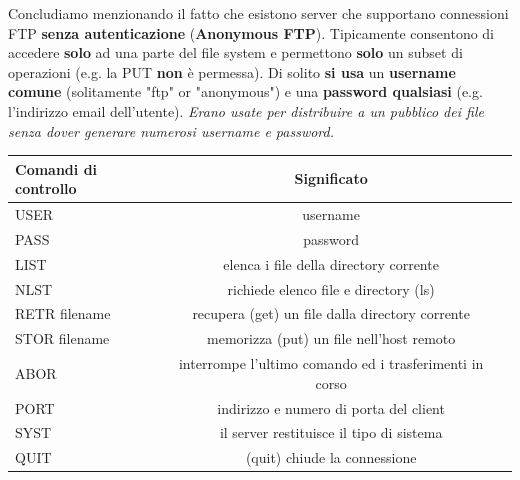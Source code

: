 \documentclass[11pt,a4paper]{article}
\theoremstyle{definition}
\begin{document}
Concludiamo menzionando il fatto che esistono server che supportano connessioni FTP \textbf{senza autenticazione} (\textbf{Anonymous FTP}).  Tipicamente consentono di accedere \textbf{solo} ad una parte del file system e permettono \textbf{solo} un subset di operazioni (e.g. la PUT \textbf{non} è permessa). Di solito \textbf{si usa} un \textbf{username comune} (solitamente "ftp" or "anonymous") e una \textbf{password qualsiasi} (e.g. l'indirizzo email dell'utente).\textit{ Erano usate per distribuire a un pubblico dei file senza dover generare numerosi username e password.}
\begin{table}[h!]
	\begin{center}
		\label{tab:table1}
		\begin{tabular}{l|c|r}
			\textbf{Comandi di controllo} & \textbf{Significato}             \\
			\hline
			USER                          & username                         \\
			PASS                          & password                         \\
			LIST                          & elenca i file della
			directory corrente                                               \\
			NLST                          & richiede elenco file e
			directory (ls)                                                   \\
			RETR filename                 & recupera (get)
			un file dalla directory
			corrente                                                         \\
			STOR filename                 & memorizza
			(put) un file nell’host remoto                                   \\
			ABOR                          & interrompe l’ultimo
			comando ed i trasferimenti in
			corso                                                            \\
			PORT                          & indirizzo e numero di porta
			del client                                                       \\
			SYST                          & il server restituisce il tipo di
			sistema                                                          \\
			QUIT                          & (quit) chiude la
			connessione                                                      \\
		\end{tabular}
	\end{center}
\end{table}
\newpage
\end{document}
